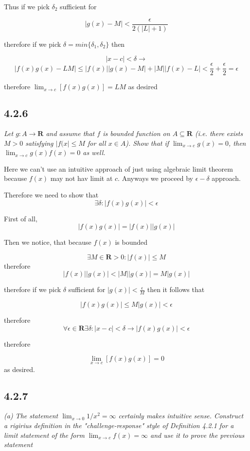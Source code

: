 \documentclass[11pt,oneside,titlepage]{book}
\begin{document}
Thus if we pick $\delta_2$ sufficient for

$$|g(x) - M| < \frac{\epsilon}{2(|L| + 1)}$$

therefore if we pick $\delta = min\{\delta_1, \delta_2\}$ then

$$|x - c| < \delta \to $$
$$|f(x)g(x) - LM| \leq |f(x)||g(x) - M| + |M||f(x) - L| <  \frac{\epsilon}{2} +
\frac{\epsilon}{2} = \epsilon  $$

therefore $\lim_{x \to c}[f(x) g(x)] = LM$ as desired

\subsection*{4.2.6}
\textit{Let $g: A\to \textbf{R}$ and assume that $f$ is bounded function on $A \subseteq \textbf{R}$
  (i.e. there exists $M > 0$ satisfying $|f(x| \leq M$ for all $x \in A$). Show that
  if $\lim_{x \to c}g(x) = 0$, then $\lim_{x \to c}g(x)f(x) = 0$ as well.}

Here we can't use an intuitive approach of just using algebraic limit theorem because $f(x)$ may
not hav limit at $c$.
Anyways we proceed by $\epsilon-\delta$ approach.

Therefore we need to show that
$$\exists \delta: |f(x)g(x)| < \epsilon$$

First of all,
$$ |f(x)g(x)| = |f(x)||g(x)|$$

Then we notice, that because $f(x)$ is bounded

$$\exists M \in \textbf{R} > 0: |f(x)| \leq M$$
therefore
$$|f(x)||g(x)| < |M||g(x)| = M|g(x)|$$

therefore if we pick $\delta$ sufficient for $|g(x)| < \frac{\epsilon}{M}$ then it follows that

$$|f(x)g(x)| \leq M|g(x)| < \epsilon$$

therefore
$$\forall \epsilon \in \textbf{R} \exists \delta : |x - c| < \delta \to |f(x)g(x)| < \epsilon$$

therefore

$$\lim_{x \to c}[f(x)g(x)] = 0$$
as desired.

\subsection*{4.2.7}
\textit{(a) The statement $\lim_{x \to 0}1/x^2 = \infty$ certainly makes intuitive sense. Construct a rigirius definition in the "challenge-response" style of Definition 4.2.1 for a limit statement of the form $\lim_{x \to c}f(x) = \infty$ and use it to prove the previous statement }
\end{document}
